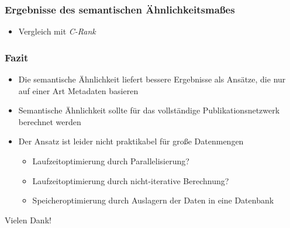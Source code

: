 \documentclass[12pt, xcolor=table]{beamer}
\begin{document}
\begin{frame}
    \frametitle{Ergebnisse des semantischen Ähnlichkeitsmaßes}
    \begin{itemize}
        \item Vergleich mit \textit{C-Rank}
    \end{itemize}
\end{frame}

\begin{frame}
    \frametitle{Fazit}
    \begin{itemize}
    \item Die semantische Ähnlichkeit liefert bessere Ergebnisse als Ansätze, die nur auf einer Art Metadaten basieren
    \item Semantische Ähnlichkeit sollte für das vollständige Publikationsnetzwerk berechnet werden
    \item Der Ansatz ist leider nicht praktikabel für große Datenmengen
        \begin{itemize}
            \item Laufzeitoptimierung durch Parallelisierung?
            \item Laufzeitoptimierung durch nicht-iterative Berechnung?
            \item Speicheroptimierung durch Auslagern der Daten in eine Datenbank
        \end{itemize}
    \end{itemize}
\end{frame}

\begin{frame}
\centerline{Vielen Dank!}
\end{frame}

\end{document}
